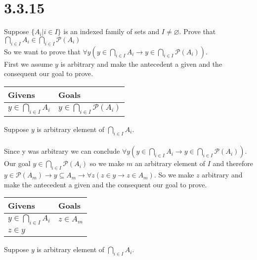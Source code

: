 \documentclass{article}
\newcommand{\n}{ \noindent }
\newcommand{\pwset}{\mathscr{P}}
\begin{document}
\section*{3.3.15}
Suppose $ \{ A_i | i \in I \}$ is an indexed family of sets and $ I \neq \varnothing$. Prove that $\bigcap_{i \in I} A_i \in \bigcap_{i \in I} \pwset(A_i)$ \\

\n So we want to prove that $\forall y (y \in \bigcap_{i \in I} A_i \rightarrow y \in \bigcap_{i \in I} \pwset(A_i))$. \\

\n First we assume $y$ is arbitrary and make the antecedent a given and the consequent our goal to prove. \\

\begin{table}[h]
\begin{tabular}{ll}
\hline
Givens & Goals   \\ \hline
$y \in \bigcap_{i \in I} A_i$ & $y \in \bigcap_{i \in I} \pwset(A_i)$   \\ \hline
\end{tabular}
\end{table}

\n Suppose $y$ is arbitrary element of $\bigcap_{i \in I} A_i$. \\
\indent [proof of $y \in \bigcap_{i \in I} \pwset(A_i)$] \\
\n Since y was arbitrary we can conclude $\forall y (y \in \bigcap_{i \in I} A_i \rightarrow y \in \bigcap_{i \in I} \pwset(A_i))$. \\

\n Our goal $y \in \bigcap_{i \in I} \pwset(A_i)$ so we make $m$ an arbitrary element of $I$ and therefore $y \in \pwset(A_m) \rightarrow y \subseteq A_m \rightarrow \forall z (z \in y \rightarrow z \in A_m)$. So we make $z$ arbitrary and make the antecedent a given and the consequent our goal to prove. \\


\begin{table}[h]
\begin{tabular}{ll}
\hline
Givens & Goals   \\ \hline
$y \in \bigcap_{i \in I} A_i$ & $z \in A_m$   \\
$z \in y$ & \\ \hline
\end{tabular}
\end{table}

\n Suppose $y$ is arbitrary element of $\bigcap_{i \in I} A_i$.
\end{document}
